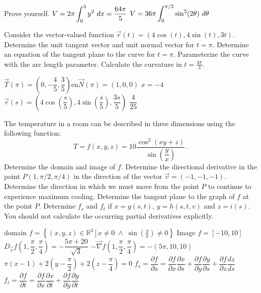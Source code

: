 \begin{Answer}

\Question Prove yourself.
\Question $\displaystyle V=2\pi\int_0^3 y^2\ dx = \dfrac{64\pi}{5}$
\Question $\displaystyle V=36\pi\int_0^{\pi/2} \sin^2(2\theta)\ d\theta$
    
\end{Answer}


\begin{Exercise}
Consider the vector-valued function $\vec{r}(t) = \left(4 \cos(t), 4 \sin(t), 3t \right)$.
\Question Determine the unit tangent vector and unit normal vector for $t=\pi$. 
	\Question Determine an equation of the tangent plane to the curve for $t=\pi$. 
	\Question Parameterize the curve with the arc length parameter.  
	\Question Calculate the curvature in $t=\frac{4 \pi}{3}$.
\end{Exercise}	
\begin{Answer}

\Question $\vec{T}(\pi) = \left(0,-\dfrac{4}{5},\dfrac{3}{5}\right)$\qquad en\qquad $\vec{N}(\pi) = (1,0,0)$
\Question $x=-4$
\Question $\vec{r}(s) = \left(4\cos\left(\dfrac{s}{5}\right),4\sin\left(\dfrac{s}{5}\right),\dfrac{3s}{5}\right)$
\Question $\dfrac{4}{25}$
    
\end{Answer}



\begin{Exercise} The temperature in a room can be described in three dimensions using the following function: 
$$T=f(x,y,z)=10\dfrac{\cos^2\left(xy+z\right)}{\sin\left(\dfrac{y}{x}\right)}\,.$$
\Question Determine the domain and image of $f$.
\Question Determine the directional derivative in the point $P(1,\pi/2,\pi/4)$ in the direction of the vector $\vec{v}=(-1,-1,-1)$. 
\Question Determine the direction in which we must move from the point $P$ to continue to experience maximum cooling. 
\Question Determine the tangent plane to the graph of $f$ at the point $P$.
\Question Determine $f_s$ and $f_t$ if $x=g(s,t)$, $y=h(s,t,v)$ and $z=i(s)$. You should not calculate the occurring partial derivatives explicitly. \end{Exercise}

\begin{Answer}

\Question domain $f = \left\{(x,y,z)\in\mathbb{R}^3\,\left|\, x\neq 0\;\wedge\; \sin\left(\frac{y}{x}\right)\neq 0\right.\right\}$
\Question[] Image $f = [-10,10]$
\Question $D_{\vec{v}} f\left(1,\dfrac{\pi}{2},\dfrac{\pi}{4}\right) = -\dfrac{5\pi+20}{\sqrt{3}}$
\Question $-\vec{\nabla} f\left(1,\dfrac{\pi}{2},\dfrac{\pi}{4}\right) = -(5\pi,10,10) $
\Question $\pi(x-1) +2\left(y-\dfrac{\pi}{2}\right) +2\left(z-\dfrac{\pi}{4}\right)=0$
\Question $f_s = \dfrac{\partial f}{\partial s} = \dfrac{\partial f}{\partial x}\dfrac{\partial x}{\partial s} + \dfrac{\partial f}{\partial y}\dfrac{\partial y}{\partial s} +\dfrac{\partial f}{\partial z}\dfrac{dz}{ds}$
\Question $f_t = \dfrac{\partial f}{\partial t} = \dfrac{\partial f}{\partial x}\dfrac{\partial x}{\partial t} + \dfrac{\partial f}{\partial y}\dfrac{\partial y}{\partial t} $
    
\end{Answer}



